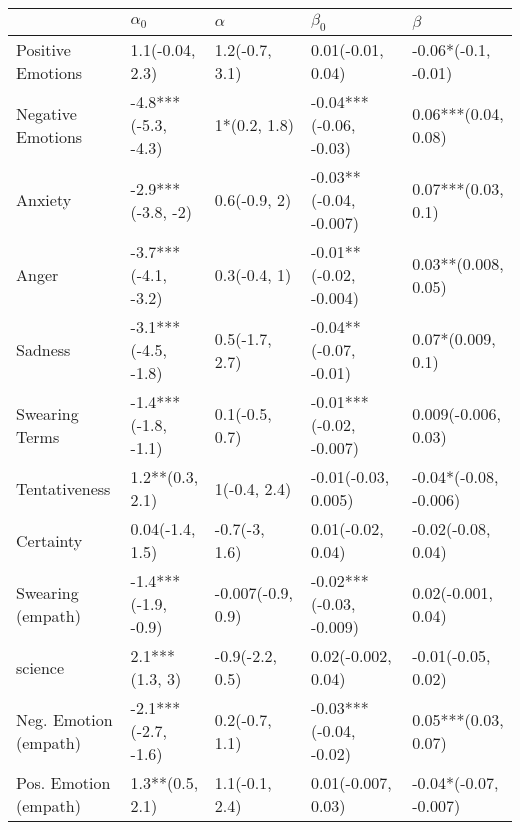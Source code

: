 \begin{tabular}{lllll}
\toprule
{} &           $\alpha_0$ &           $\alpha$ &                $\beta_0$ &                $\beta$ \\
\midrule
Positive Emotions     &      1.1(-0.04, 2.3) &     1.2(-0.7, 3.1) &        0.01(-0.01, 0.04) &    -0.06*(-0.1, -0.01) \\
Negative Emotions     &  -4.8***(-5.3, -4.3) &       1*(0.2, 1.8) &   -0.04***(-0.06, -0.03) &    0.06***(0.04, 0.08) \\
Anxiety               &    -2.9***(-3.8, -2) &       0.6(-0.9, 2) &   -0.03**(-0.04, -0.007) &     0.07***(0.03, 0.1) \\
Anger                 &  -3.7***(-4.1, -3.2) &       0.3(-0.4, 1) &   -0.01**(-0.02, -0.004) &    0.03**(0.008, 0.05) \\
Sadness               &  -3.1***(-4.5, -1.8) &     0.5(-1.7, 2.7) &    -0.04**(-0.07, -0.01) &      0.07*(0.009, 0.1) \\
Swearing Terms        &  -1.4***(-1.8, -1.1) &     0.1(-0.5, 0.7) &  -0.01***(-0.02, -0.007) &    0.009(-0.006, 0.03) \\
Tentativeness         &      1.2**(0.3, 2.1) &       1(-0.4, 2.4) &      -0.01(-0.03, 0.005) &  -0.04*(-0.08, -0.006) \\
Certainty             &      0.04(-1.4, 1.5) &      -0.7(-3, 1.6) &        0.01(-0.02, 0.04) &     -0.02(-0.08, 0.04) \\
Swearing (empath)     &  -1.4***(-1.9, -0.9) &  -0.007(-0.9, 0.9) &  -0.02***(-0.03, -0.009) &     0.02(-0.001, 0.04) \\
science               &       2.1***(1.3, 3) &    -0.9(-2.2, 0.5) &       0.02(-0.002, 0.04) &     -0.01(-0.05, 0.02) \\
Neg. Emotion (empath) &  -2.1***(-2.7, -1.6) &     0.2(-0.7, 1.1) &   -0.03***(-0.04, -0.02) &    0.05***(0.03, 0.07) \\
Pos. Emotion (empath) &      1.3**(0.5, 2.1) &     1.1(-0.1, 2.4) &       0.01(-0.007, 0.03) &  -0.04*(-0.07, -0.007) \\
\bottomrule
\end{tabular}
